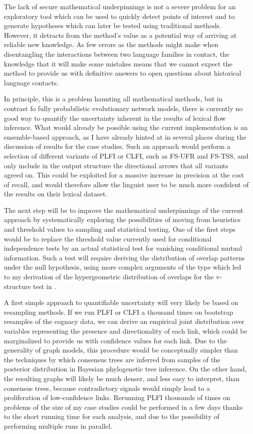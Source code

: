 The lack of secure mathematical underpinnings is not a severe problem for an exploratory tool which can be used to quickly detect points of interest and to generate hypotheses which can later be tested using traditional methods. However, it detracts from the method's value as a potential way of arriving at reliable new knowledge. As few errors as the methods might make when disentangling the interactions between two language families in contact, the knowledge that it will make some mistakes means that we cannot expect the method to provide us with definitive answers to open questions about historical language contacts. 

In principle, this is a problem haunting all mathematical methods, but in contrast fo fully probabilistic evolutionary network models, there is currently no good way to quantify the uncertainty inherent in the results of lexical flow inference. What would already be possible using the current implementation is an ensemble-based approach, as I have already hinted at in several places during the discussion of results for the case studies. Such an approach would perform a selection of different variants of PLFI or CLFI, such as FS-UFR and FS-TSS, and only include in the output structure the directional arrows that all variants agreed on. This could be exploited for a massive increase in precision at the cost of recall, and would therefore allow the linguist user to be much more confident of the results on their lexical dataset.

\largerpage
The next step will be to improve the mathematical underpinnings of the current approach by systematically exploring the possibilities of moving from heuristics and threshold values to sampling and statistical testing. One of the first steps would be to replace the threshold value currently used for conditional independence tests by an actual statistical test for vanishing conditional mutual information. Such a test will require deriving the distribution of overlap patterns under the null hypothesis, using more complex arguments of the type which led to my derivation of the hypergeometric distribution of overlaps for the v-structure test in .

A first simple approach to quantifiable uncertainty will very likely be based on resampling methods. If we run PLFI or CLFI a thousand times on bootstrap resamples of the cognacy data, we can derive an empirical joint distribution over variables representing the presence and directionality of each link, which could be marginalized to provide us with confidence values for each link. Due to the generality of graph models, this procedure would be conceptually simpler than the techniques by which consensus trees are inferred from samples of the posterior distribution in Bayesian phylogenetic tree inference. On the other hand, the resulting graphs will likely be much denser, and less easy to interpret, than consensus trees, because contradictory signals would simply lead to a proliferation of low-confidence links. Rerunning PLFI thousands of times on problems of the size of my case studies could be performed in a few days thanks to the short running time for each analysis, and due to the possibility of performing multiple runs in parallel.

